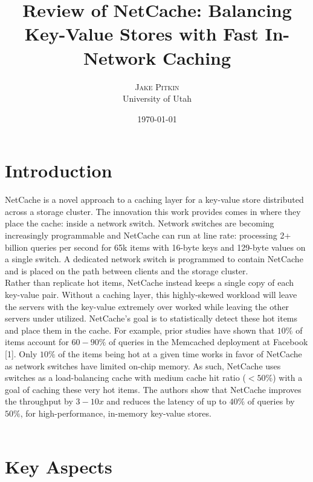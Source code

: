 \documentclass[11pt,twoside,twocolumn]{article}
\title{Review of NetCache: Balancing Key-Value Stores with Fast In-Network Caching} %
\author{%
\textsc{Jake Pitkin} \\ %
\normalsize University of Utah \\ %
}
\date{\today} %
\begin{document}
\maketitle


\section*{Introduction} NetCache is a novel approach to a caching layer for a key-value store distributed across a storage cluster. The innovation this work provides comes in where they place the cache: inside a network switch. Network switches are becoming increasingly programmable and NetCache can run at line rate: processing 2+ billion queries per second for 65k items with 16-byte keys and 129-byte values on a single switch. A dedicated network switch is programmed to contain NetCache and is placed on the path between clients and the storage cluster. \\
\hspace*{5mm}Rather than replicate hot items, NetCache instead keeps a single copy of each key-value pair. Without a caching layer, this highly-skewed workload will leave the servers with the key-value extremely over worked while leaving the other servers under utilized. NetCache's goal is to statistically detect these hot items and place them in the cache. For example, prior studies have shown that $10\%$ of items account for $60-90\%$ of queries in the Memcached deployment at Facebook [1]. Only $10\%$ of the items being hot at a given time works in favor of NetCache as network switches have limited on-chip memory. As such, NetCache uses switches as a load-balancing cache with medium cache hit ratio ($<50\%$) with a goal of caching these very hot items. The authors show that NetCache improves the throughput by $3-10x$ and reduces the latency of up to $40\%$ of queries by $50\%$, for high-performance, in-memory key-value stores. \\ \\


\section*{Key Aspects}
\end{document}

